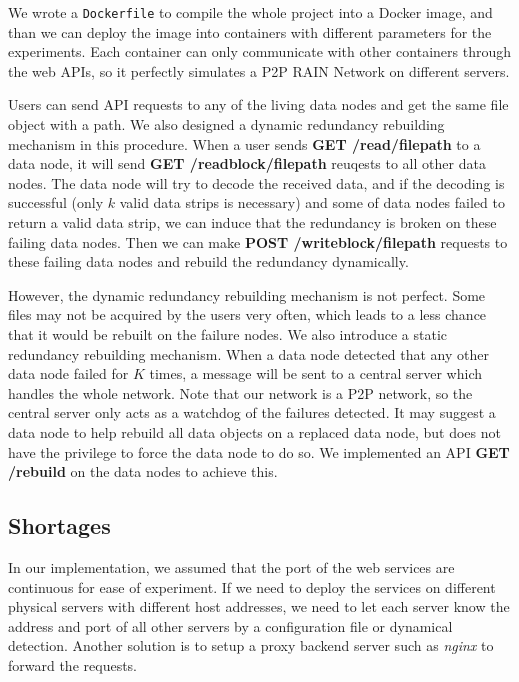 \documentclass[conference]{IEEEtran}
\begin{document}
We wrote a \texttt{Dockerfile} to compile the whole project into a Docker image, and than we can deploy the image into containers with different parameters for the experiments. Each container can only communicate with other containers through the web APIs, so it perfectly simulates a P2P RAIN Network on different servers. 

Users can send API requests to any of the living data nodes and get the same file object with a path. We also designed a dynamic redundancy rebuilding mechanism in this procedure. When a user sends \textbf{GET /read/filepath} to a data node, it will send  \textbf{GET /readblock/filepath} reuqests to all other data nodes. The data node will try to decode the received data, and if the decoding is successful (only $k$ valid data strips is necessary) and some of data nodes failed to return a valid data strip, we can induce that the redundancy is broken on these failing data nodes. Then we can make \textbf{POST /writeblock/filepath} requests to these failing data nodes and rebuild the redundancy dynamically.  

However, the dynamic redundancy rebuilding mechanism is not perfect. Some files may not be acquired by the users very often, which leads to a less chance that it would be rebuilt on the failure nodes. We also introduce a static redundancy rebuilding mechanism. When a data node detected that any other data node failed for $K$ times, a message will be sent to a central server which handles the whole network. Note that our network is a P2P network, so the central server only acts as a watchdog of the failures detected. It may suggest a data node to help rebuild all data objects on a replaced data node, but does not have the privilege to force the data node to do so. We implemented an API \textbf{GET /rebuild} on the data nodes to achieve this.

\subsection{Shortages}

In our implementation, we assumed that the port of the web services are continuous for ease of experiment. If we need to deploy the services on different physical servers with different host addresses, we need to let each server know the address and port of all other servers by a configuration file or dynamical detection. Another solution is to setup a proxy backend server such as \textit{nginx} to forward the requests.  
\end{document}
